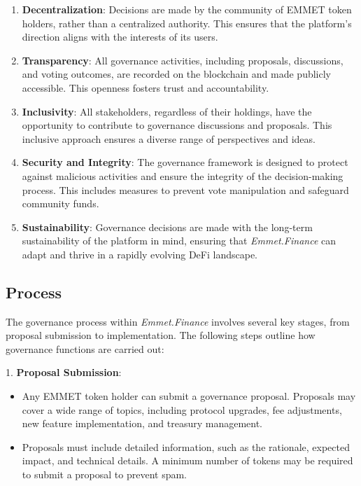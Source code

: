 \documentclass[12pt, a4paper]{article}
\begin{document}
\begin{enumerate}
    \item \textbf{Decentralization}: Decisions are made by the community of EMMET token holders, rather than a centralized authority. This ensures that the platform's direction aligns with the interests of its users.
    \item \textbf{Transparency}: All governance activities, including proposals, discussions, and voting outcomes, are recorded on the blockchain and made publicly accessible. This openness fosters trust and accountability.
    \item \textbf{Inclusivity}: All stakeholders, regardless of their holdings, have the opportunity to contribute to governance discussions and proposals. This inclusive approach ensures a diverse range of perspectives and ideas.
    \item \textbf{Security and Integrity}: The governance framework is designed to protect against malicious activities and ensure the integrity of the decision-making process. This includes measures to prevent vote manipulation and safeguard community funds.
    \item \textbf{Sustainability}: Governance decisions are made with the long-term sustainability of the platform in mind, ensuring that \textit{Emmet.Finance} can adapt and thrive in a rapidly evolving DeFi landscape.
\end{enumerate}

\subsection{Process}

The governance process within \textit{Emmet.Finance} involves several key stages, from proposal submission to implementation. The following steps outline how governance functions are carried out:

1. \textbf{Proposal Submission}:
   \begin{itemize}
       \item Any EMMET token holder can submit a governance proposal. Proposals may cover a wide range of topics, including protocol upgrades, fee adjustments, new feature implementation, and treasury management.
       \item Proposals must include detailed information, such as the rationale, expected impact, and technical details. A minimum number of tokens may be required to submit a proposal to prevent spam.
   \end{itemize}
\end{document}
